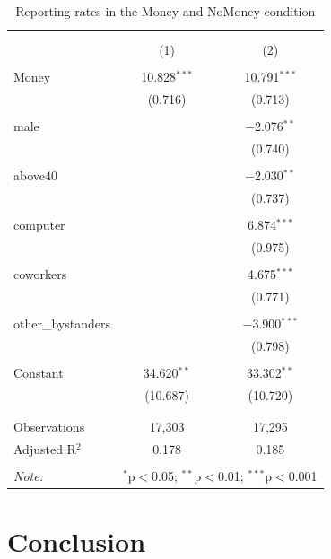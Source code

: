 \documentclass[12pt,halfline,a4paper,]{ouparticle}
\begin{document}
\begin{table}[!htbp] \centering 
  \caption{Reporting rates in the Money and NoMoney condition} 
  \label{} 
\begin{tabular}{@{\extracolsep{5pt}}lcc} 
\\[-1.8ex]\hline 
\hline \\[-1.8ex] 
\\[-1.8ex] & (1) & (2)\\ 
\hline \\[-1.8ex] 
 Money & 10.828$^{***}$ & 10.791$^{***}$ \\ 
  & (0.716) & (0.713) \\ 
  & & \\ 
 male &  & $-$2.076$^{**}$ \\ 
  &  & (0.740) \\ 
  & & \\ 
 above40 &  & $-$2.030$^{**}$ \\ 
  &  & (0.737) \\ 
  & & \\ 
 computer &  & 6.874$^{***}$ \\ 
  &  & (0.975) \\ 
  & & \\ 
 coworkers &  & 4.675$^{***}$ \\ 
  &  & (0.771) \\ 
  & & \\ 
 other\_bystanders &  & $-$3.900$^{***}$ \\ 
  &  & (0.798) \\ 
  & & \\ 
 Constant & 34.620$^{**}$ & 33.302$^{**}$ \\ 
  & (10.687) & (10.720) \\ 
  & & \\ 
\hline \\[-1.8ex] 
Observations & 17,303 & 17,295 \\ 
Adjusted R$^{2}$ & 0.178 & 0.185 \\ 
\hline 
\hline \\[-1.8ex] 
\textit{Note:}  & \multicolumn{2}{r}{$^{*}$p$<$0.05; $^{**}$p$<$0.01; $^{***}$p$<$0.001} \\ 
\end{tabular} 
\end{table}

\hypertarget{conclusion}{%
\section{Conclusion}\label{conclusion}}
\end{document}
